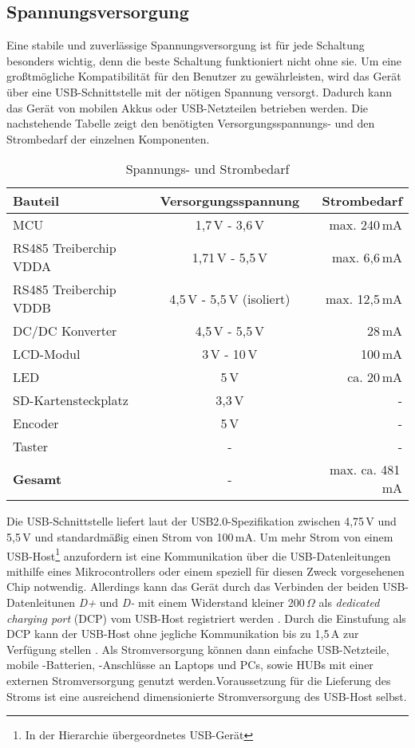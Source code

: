 
\subsection{Spannungsversorgung}
Eine stabile und zuverlässige Spannungsversorgung ist für jede Schaltung besonders wichtig, denn die beste Schaltung funktioniert nicht ohne sie. Um eine großtmögliche Kompatibilität für den Benutzer zu gewährleisten, wird das Gerät über eine USB-Schnittstelle mit der nötigen Spannung versorgt. Dadurch kann das Gerät von mobilen Akkus oder USB-Netzteilen betrieben werden. Die nachstehende Tabelle zeigt den benötigten Versorgungsspannungs- und den Strombedarf der einzelnen Komponenten. 
\begin{table}[h]
	\begin{center}
		\caption{Spannungs- und Strombedarf}
		\begin{tabular}{l | c | r }
			\textbf{Bauteil} & \textbf{Versorgungsspannung} & \textbf{Strombedarf}\\
			\hline
			MCU & 1,7\,V - 3,6\,V & max. 240\,mA\\
			RS485 Treiberchip VDDA & 1,71\,V - 5,5\,V & max. 6,6\,mA\\
			RS485 Treiberchip VDDB & 4,5\,V - 5,5\,V (isoliert)& max. 12,5\,mA\\
			DC/DC Konverter & 4,5\,V - 5,5\,V & 28\,mA\\
			LCD-Modul & 3\,V - 10\,V & 100\,mA\\
			LED & 5\,V & ca. 20\,mA\\
			SD-Kartensteckplatz & 3,3\,V & -\\
			Encoder & 5\,V & -\\
			Taster & - & -\\
			\hline
			\textbf{Gesamt} & - & max. ca. 481\,mA
		\end{tabular}
	\label{tab:VDD+IDD}
	\end{center}
\end{table}
Die USB-Schnittstelle liefert laut der USB2.0-Spezifikation zwischen 4,75\,V und 5,5\,V \cite[S. 283]{USB-PD} und standardmäßig einen Strom von 100\,mA. Um mehr Strom von einem USB-Host\footnote{In der Hierarchie übergeordnetes USB-Gerät} anzufordern ist eine Kommunikation über die USB-Datenleitungen mithilfe eines Mikrocontrollers oder einem speziell für diesen Zweck vorgesehenen Chip notwendig. Allerdings kann das Gerät durch das Verbinden der beiden USB-Datenleitunen \textit{D+} und \textit{D-} mit einem Widerstand kleiner 200\,$\Omega$ als \textit{dedicated charging port} (DCP) vom USB-Host registriert werden \cite[S. 41]{USB-Battery}. Durch die Einstufung als DCP kann der USB-Host ohne jegliche Kommunikation bis zu 1,5\,A zur Verfügung stellen \cite[S. 45]{USB-Battery}. Als Stromversorgung können dann einfache USB-Netzteile, mobile -Batterien, -Anschlüsse an Laptops und PCs, sowie HUBs mit einer externen Stromversorgung genutzt werden.Voraussetzung für die Lieferung des Stroms ist eine ausreichend dimensionierte Stromversorgung des USB-Host selbst. 
